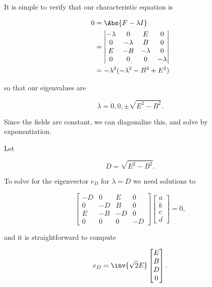 It is simple to verify that our characteristic equation is

\begin{align*}
0 
&= \Abs{ F - \lambda I } \\
&= \begin{vmatrix}
-\lambda & 0 & E & 0 \\
0 & -\lambda & B & 0 \\
E & -B & -\lambda & 0 \\
0 & 0 & 0 & -\lambda
\end{vmatrix} \\
&= -\lambda^2 ( -\lambda^2 - B^2 + E^2 )
\end{align*}

so that our eigenvalues are

\begin{equation}\label{eqn:relElectroDynProblemSet2:550}
\lambda = 0, 0, \pm \sqrt{E^2 - B^2}.
\end{equation}

Since the fields are constant, we can diagonalize this, and solve by exponentiation.

Let 

\begin{equation}\label{eqn:relElectroDynProblemSet2:570}
D = \sqrt{E^2 - B^2}.
\end{equation}

To solve for the eigenvector $e_D$ for $\lambda = D$ we need solutions to

\begin{equation}\label{eqn:relElectroDynProblemSet2:590}
\begin{bmatrix}
-D & 0 & E & 0 \\
0 & -D & B & 0 \\
E & -B & -D & 0 \\
0 & 0 & 0 & -D
\end{bmatrix} 
\begin{bmatrix} 
a \\
b \\
c \\
d
\end{bmatrix} 
 = 0,
\end{equation}

and it is straightforward to compute

\begin{equation}\label{eqn:relElectroDynProblemSet2:610}
e_D = 
\inv{\sqrt{2}E}
\begin{bmatrix} 
E \\
B \\
D \\
0
\end{bmatrix}.
\end{equation}

